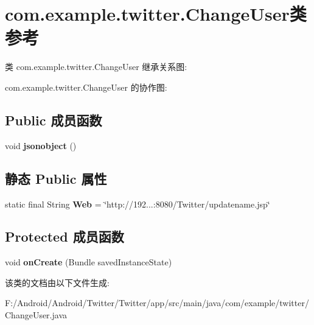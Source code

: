 \hypertarget{classcom_1_1example_1_1twitter_1_1_change_user}{}\section{com.\+example.\+twitter.\+Change\+User类 参考}
\label{classcom_1_1example_1_1twitter_1_1_change_user}


类 com.\+example.\+twitter.\+Change\+User 继承关系图\+:


com.\+example.\+twitter.\+Change\+User 的协作图\+:
\subsection*{Public 成员函数}
\begin{DoxyCompactItemize}
\item 
\mbox{\label{classcom_1_1example_1_1twitter_1_1_change_user_a9e52433e4d924871efbe16a81cc03c92}} 
void {\bfseries jsonobject} ()
\end{DoxyCompactItemize}
\subsection*{静态 Public 属性}
\begin{DoxyCompactItemize}
\item 
\mbox{\label{classcom_1_1example_1_1twitter_1_1_change_user_ac7999e04d3b12f035edd63a422e59b41}} 
static final String {\bfseries Web} = \char`\"{}http\+://192...\+:8080/Twitter/updatename.\+jsp\char`\"{}
\end{DoxyCompactItemize}
\subsection*{Protected 成员函数}
\begin{DoxyCompactItemize}
\item 
\mbox{\label{classcom_1_1example_1_1twitter_1_1_change_user_ab8633d33efbf29756d60a5254342f8e0}} 
void {\bfseries on\+Create} (Bundle saved\+Instance\+State)
\end{DoxyCompactItemize}


该类的文档由以下文件生成\+:\begin{DoxyCompactItemize}
\item 
F\+:/\+Android/\+Android/\+Twitter/\+Twitter/app/src/main/java/com/example/twitter/Change\+User.\+java\end{DoxyCompactItemize}
